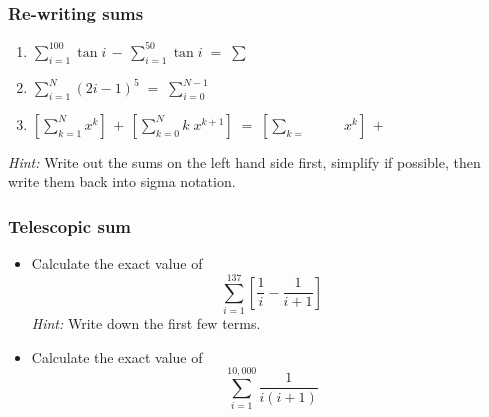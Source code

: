 \begin{frame}[t]
	\fontsize{13}{13}\selectfont
	\frametitle{Re-writing sums}

	\begin{enumerate}
		\item $\displaystyle \sum_{i=1}^{100}\tan i \, - \, \sum_{i=1}^{50}\tan i \;
			= \; \sum_{\boxed{\phantom{???}}}^{\boxed{\phantom{???}}}\boxed{\phantom{?????^f_p}}$
			\vfill

		\item $\displaystyle \sum_{i=1}^{N}(2i-1)^{5}\; = \; \sum_{i=0}^{N-1}\boxed{\phantom{?????^f_p}}$
			\vfill

		\item $\displaystyle \left[ \sum_{k=1}^{N}x^{k}\right] \, + \, \left[ \sum_{k=0}
			^{N}k \; x^{k+1}\right] \; = \; \left[ \sum_{k=\boxed{\phantom{???}}}^{\boxed{\phantom{???}}}
			\!\!\boxed{\phantom{???}}\,x^{k}\right] \, + \, \boxed{\phantom{???}}$
			\vfill
	\end{enumerate}

	\emph{Hint:} Write out the sums on the left hand side first, simplify if
	possible, then write them back into sigma notation.
\end{frame}

\begin{frame}[t]
	\frametitle{Telescopic sum}

	\begin{itemize}
		\item Calculate the exact value of
			\[
				\sum_{i=1}^{137}\left[ \frac{1}{i}- \frac{1}{i+1}\right]
			\]
			\emph{Hint:} Write down the first few terms.


		\item Calculate the exact value of
			\[
				\sum_{i=1}^{10,000}\frac{1}{i(i+1)}
			\]
	\end{itemize}
\end{frame}

